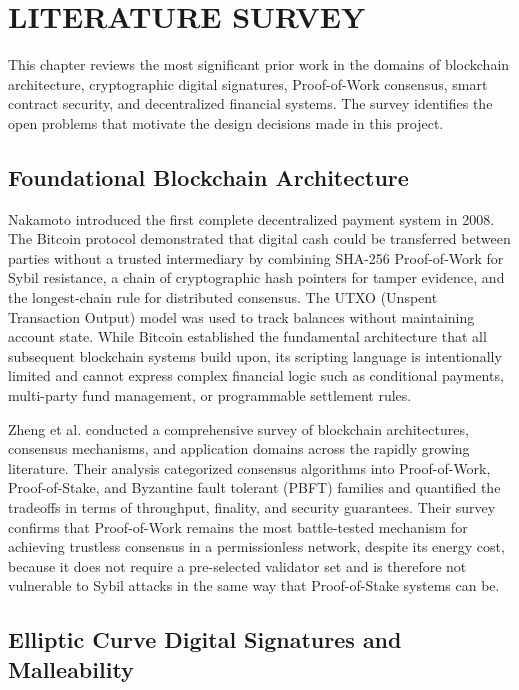 \documentclass[12pt,a4paper]{report}
\begin{document}
\chapter{LITERATURE SURVEY}

This chapter reviews the most significant prior work in the domains of blockchain
architecture, cryptographic digital signatures, Proof-of-Work consensus, smart contract
security, and decentralized financial systems. The survey identifies the open problems
that motivate the design decisions made in this project.

\section{Foundational Blockchain Architecture}

Nakamoto \cite{nakamoto2008} introduced the first complete decentralized payment system
in 2008. The Bitcoin protocol demonstrated that digital cash could be transferred between
parties without a trusted intermediary by combining SHA-256 Proof-of-Work for Sybil
resistance, a chain of cryptographic hash pointers for tamper evidence, and the
longest-chain rule for distributed consensus. The UTXO (Unspent Transaction Output) model
was used to track balances without maintaining account state. While Bitcoin established
the fundamental architecture that all subsequent blockchain systems build upon, its
scripting language is intentionally limited and cannot express complex financial logic
such as conditional payments, multi-party fund management, or programmable settlement rules.

Zheng et al. \cite{zheng2017} conducted a comprehensive survey of blockchain architectures,
consensus mechanisms, and application domains across the rapidly growing literature.
Their analysis categorized consensus algorithms into Proof-of-Work, Proof-of-Stake, and
Byzantine fault tolerant (PBFT) families and quantified the tradeoffs in terms of
throughput, finality, and security guarantees. Their survey confirms that Proof-of-Work
remains the most battle-tested mechanism for achieving trustless consensus in a
permissionless network, despite its energy cost, because it does not require a pre-selected
validator set and is therefore not vulnerable to Sybil attacks in the same way that
Proof-of-Stake systems can be.

\section{Elliptic Curve Digital Signatures and Malleability}
\end{document}
